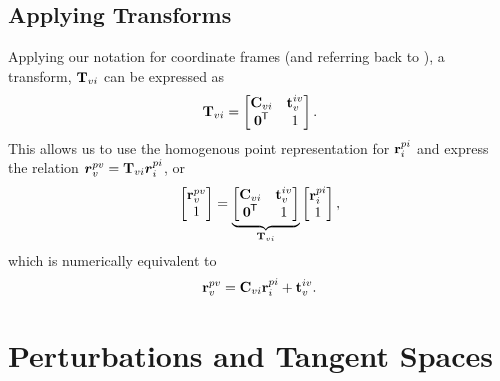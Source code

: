\subsection{Applying Transforms}
Applying our notation for coordinate frames (and referring back to ), a transform, $\boldsymbol{\mathbf{T}}_{vi}$ can be expressed as 
\begin{equation}
\boldsymbol{\mathbf{T}}_{vi} = \begin{bmatrix} \boldsymbol{\mathbf{C}}_{vi} & \boldsymbol{\mathbf{t}}_v^{iv} \\ \boldsymbol{\mathbf{0}}^{\mkern-1.0mu\mathsf{T}} & 1 \end{bmatrix}.
\end{equation}
This allows us to use the homogenous point representation for $\boldsymbol{\mathbf{r}}^{pi}_i$ and express the relation $\boldsymbol{r}^{pv}_v = \boldsymbol{\mathbf{T}}_{vi} \boldsymbol{r}^{pi}_i$, or
\begin{equation}
	\begin{bmatrix} \boldsymbol{\mathbf{r}}^{pv}_v \\ 1 \end{bmatrix} = \underbrace{\begin{bmatrix} \boldsymbol{\mathbf{C}}_{vi} & \boldsymbol{\mathbf{t}}_v^{iv} \\ \boldsymbol{\mathbf{0}}^{\mkern-1.0mu\mathsf{T}} & 1 \end{bmatrix}}_{\boldsymbol{\mathbf{T}}_{vi}} \begin{bmatrix} \boldsymbol{\mathbf{r}}^{pi}_i \\ 1 \end{bmatrix},
\end{equation}
which is numerically equivalent to  
\begin{equation}
 \boldsymbol{\mathbf{r}}^{pv}_v =  \boldsymbol{\mathbf{C}}_{vi} \boldsymbol{\mathbf{r}}^{pi}_i + \boldsymbol{\mathbf{t}}_v^{iv}.  
 \end{equation}

\section{Perturbations and Tangent Spaces}
\label{sec:math_perturbations}

